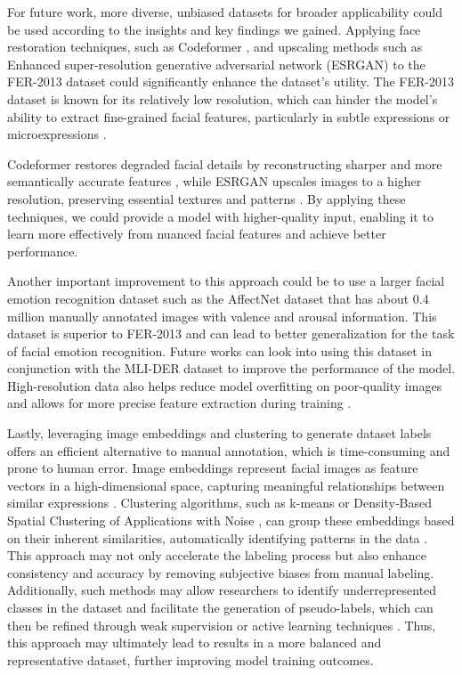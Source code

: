 \documentclass[sigconf]{acmart}
\begin{document}
For future work, more diverse, unbiased datasets for broader applicability could be used according to the insights and key findings we gained. 
Applying face restoration techniques, such as Codeformer \cite{zhou2022towards}, and upscaling methods such as Enhanced super-resolution generative adversarial network (ESRGAN) \cite{wang2018esrgan} to the FER-2013 dataset could significantly enhance the dataset's utility. The FER-2013 dataset is known for its relatively low resolution, which can hinder the model's ability to extract fine-grained facial features, particularly in subtle expressions or microexpressions \cite{pfister2011recognising}.

Codeformer restores degraded facial details by reconstructing sharper and more semantically accurate features \cite{zhou2022towards}, while ESRGAN upscales images to a higher resolution, preserving essential textures and patterns \cite{wang2018esrgan}. By applying these techniques, we could provide a model with higher-quality input, enabling it to learn more effectively from nuanced facial features and achieve better performance. 

Another important improvement to this approach could be to use a larger facial emotion recognition dataset such as the AffectNet dataset \cite{8013713} that has about 0.4 million manually annotated images with valence and arousal information. This dataset is superior to FER-2013 and can lead to better generalization for the task of facial emotion recognition. Future works can look into using this dataset in conjunction with the MLI-DER dataset to improve the performance of the model. High-resolution data also helps reduce model overfitting on poor-quality images and allows for more precise feature extraction during training \cite{tian2011facial}.

Lastly, leveraging image embeddings and clustering to generate dataset labels offers an efficient alternative to manual annotation, which is time-consuming and prone to human error. Image embeddings represent facial images as feature vectors in a high-dimensional space, capturing meaningful relationships between similar expressions \cite{zhang2021learning}. Clustering algorithms, such as k-means or Density‐Based Spatial Clustering of Applications with Noise \cite{kremers2023two}, can group these embeddings based on their inherent similarities, automatically identifying patterns in the data \cite{vu2019efficient}. This approach may not only accelerate the labeling process but also enhance consistency and accuracy by removing subjective biases from manual labeling. Additionally, such methods may allow researchers to identify underrepresented classes in the dataset and facilitate the generation of pseudo-labels, which can then be refined through weak  supervision or active learning techniques \cite{vu2019efficient}. Thus, this approach may ultimately lead to results in a more balanced and representative dataset, further improving model training outcomes.
\end{document}
